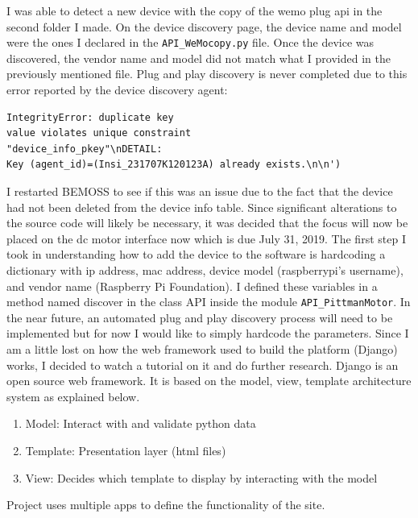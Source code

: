 \documentclass[fontsize=11pt, %
                             paper=letter, %
                             twoside, %
                             captions=tableheading,
                             index=totoc,
                             hyperref]{labbook}
\begin{document}
\begin{addmargin}[0cm]{0cm}
I was able to detect a new device with the copy of the wemo plug api in the second folder I made. On the device discovery page, the device name and model were the ones I declared in the \texttt{API\_WeMocopy.py} file. Once the device was discovered, the vendor name and model did not match what I provided in the previously mentioned file. Plug and play discovery is never completed due to this error reported by the device discovery agent:
\begin{verbatim}
IntegrityError: duplicate key
value violates unique constraint
"device_info_pkey"\nDETAIL:  
Key (agent_id)=(Insi_231707K120123A) already exists.\n\n')
\end{verbatim}
I restarted BEMOSS to see if this was an issue due to the fact that the device had not been deleted from the device info table. Since significant alterations to the source code will likely be necessary, it was decided that the focus will now be placed on the dc motor interface now which is due July 31, 2019.
\bigbreak\noindent
The first step I took in understanding how to add the device to the software is hardcoding a dictionary with ip address, mac address, device model (raspberrypi's username), and vendor name (Raspberry Pi Foundation). I defined these variables in a method named discover in the class API inside the module \texttt{API\_PittmanMotor}. In the near future, an automated plug and play discovery process will need to be implemented but for now I would like to simply hardcode the parameters. Since I am a little lost on how the web framework used to build the platform (Django) works, I decided to watch a tutorial on it and do further research.
\bigbreak\noindent
Django is an open source web framework. It is based on the model, view, template architecture system as explained below.
\begin{enumerate}
\item Model: Interact with and validate python data
\item Template: Presentation layer (html files)
\item View: Decides which template to display by interacting with the model
\end{enumerate}
Project uses multiple apps to define the functionality of the site.


\end{addmargin}
\end{document}
